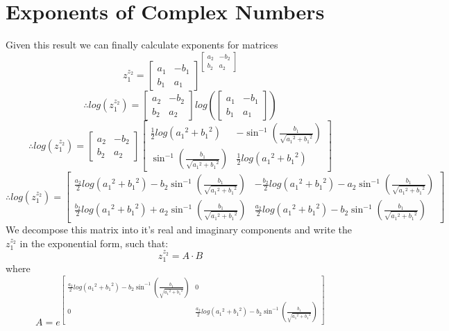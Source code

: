 \documentclass[12pt]{article}
\begin{document}
    \section{Exponents of Complex Numbers}
    Given this result we can finally calculate exponents for matrices
    $$ z_{1}^{z_{2}} = {\begin{bmatrix} a_{1} & -b_{1} \\ b_{1} & a_{1}   \end{bmatrix}}^{\begin{bmatrix} a_{2} & -b_{2} \\ b_{2} & a_{2}   \end{bmatrix}}$$
    $$ \therefore
    log(z_{1}^{z_{2}}) = \begin{bmatrix} a_{2} & -b_{2} \\ b_{2} & a_{2}   \end{bmatrix} log( \begin{bmatrix} a_{1} & -b_{1} \\ b_{1} & a_{1}   \end{bmatrix} )
    $$
    $$ \therefore
    log(z_{1}^{z_{2}}) = \begin{bmatrix} a_{2} & -b_{2} \\ b_{2} & a_{2} \end{bmatrix}
    \begin{bmatrix}
        \frac{1}{2}log({a_{1}}^2 + {b_{1}}^2) & -\sin^{-1}\left({\frac{b_1}{\sqrt{{a_1}^2 + {b_1}^2}}}\right) \\
        \sin^{-1}\left({\frac{b_1}{\sqrt{{a_1}^2 + {b_1}^2}}}\right) & \frac{1}{2}log({a_{1}}^2 + {b_{1}}^2)
    \end{bmatrix} 
    $$
    $$ \therefore log(z_{1}^{z_{2}}) = \begin{bmatrix} 
        \frac{a_2}{2}log({a_{1}}^2 + {b_{1}}^2) - {b_2}\sin^{-1}\left({\frac{b_1}{\sqrt{{a_1}^2 + {b_1}^2}}}\right) & - \frac{b_2}{2}log({a_{1}}^2 + {b_{1}}^2) - {a_2}\sin^{-1}\left({\frac{b_1}{\sqrt{{a_1}^2 + {b_1}^2}}}\right) \\ 
        \frac{b_2}{2}log({a_{1}}^2 + {b_{1}}^2) + {a_2}\sin^{-1}\left({\frac{b_1}{\sqrt{{a_1}^2 + {b_1}^2}}}\right) & \frac{a_2}{2}log({a_{1}}^2 + {b_{1}}^2) - {b_2}\sin^{-1}\left({\frac{b_1}{\sqrt{{a_1}^2 + {b_1}^2}}}\right)
    \end{bmatrix}
    $$
    We decompose this matrix into it's real and imaginary components and write the $ z_{1}^{z_{2}} $ in the exponential form, such that:
    $$ z_{1}^{z_{2}} = A \cdot B$$
    where
    $$ A = 
    e^{
        \begin{bmatrix} 
            \frac{a_2}{2}log({a_{1}}^2 + {b_{1}}^2) - {b_2}\sin^{-1}\left({\frac{b_1}{\sqrt{{a_1}^2 + {b_1}^2}}}\right) & 0 \\ 
            0 & \frac{a_2}{2}log({a_{1}}^2 + {b_{1}}^2) - {b_2}\sin^{-1}\left({\frac{b_1}{\sqrt{{a_1}^2 + {b_1}^2}}}\right)
        \end{bmatrix}
    } 
    $$
\end{document}
